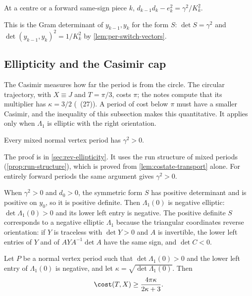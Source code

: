 \begin{lemma}\label{lem:gram}
At a centre or a forward same-sign piece $k$, $d_{k-1}d_k-e_k^2=\gamma^2/K_k^2$.
\end{lemma}

This is the Gram determinant of $y_{k-1},y_k$ for the form $S$: $\det S=\gamma^2$ and
$\det(y_{k-1},y_k)^2=1/K_k^2$ by \cref{lem:per-switch-vectors}.

\subsection{Ellipticity and the Casimir cap}\label{sec:per-casimir}

The Casimir measures how far the period is from the circle. The circular trajectory, with
$X\equiv J$ and $T=\pi/3$, costs $\pi$; the notes compute that its multiplier has $\kappa=3/2$
(~(27)). A period of cost below $\pi$ must have a smaller Casimir,
and the inequality of this subsection makes this quantitative. It applies only when
$\Lambda_1$ is elliptic with the right orientation.

\begin{proposition}[Ellipticity]\label{prop:ellipticity}
Every mixed normal vertex period has $\gamma^2>0$.
\end{proposition}

The proof is in \cref{sec:rev-ellipticity}. It uses the run structure of mixed periods
(\cref{prop:run-structure}), which is proved from \cref{lem:costate-transport} alone. For
entirely forward periods the same argument gives $\gamma^2>0$.

When $\gamma^2>0$ and $d_0>0$, the symmetric form $S$ has positive determinant and is positive on
$y_0$, so it is positive definite. Then $\Lambda_1(0)$ is negative elliptic: $\det\Lambda_1(0)>0$
and its lower left entry is negative. The positive definite $S$ corresponds to a negative elliptic
$\Lambda_1$ because the triangular coordinates reverse orientation: if $Y$ is traceless with
$\det Y>0$ and $A$ is invertible, the lower left entries of $Y$ and of $AYA^{-1}\det A$ have the
same sign, and $\det C<0$.

\begin{proposition}\label{prop:cost-casimir}
Let $P$ be a normal vertex period such that $\det\Lambda_1(0)>0$ and the lower left entry of
$\Lambda_1(0)$ is negative, and let $\kappa=\sqrt{\det\Lambda_1(0)}$. Then
\[
  \cost(T,X)\ge\frac{4\pi\kappa}{2\kappa+3}.
\]
\end{proposition}


